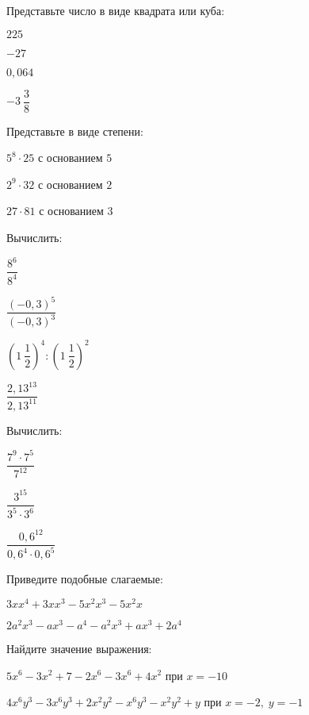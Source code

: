 \begin{listofex}
	\item Представьте число в виде квадрата или куба:
	\begin{enumcols}[itemcolumns=4]
		\item \( 225 \)
		\item \( -27 \)
		\item \(0,064 \)
		\item \( -3\:\dfrac{3}{8} \)
	\end{enumcols}
	\item Представьте в виде степени:
	\begin{enumcols}[itemcolumns=3]
		\item \( 5^8\cdot25 \) с основанием \( 5 \)
		\item \( 2^9\cdot32 \) с основанием \( 2 \)
		\item \( 27\cdot81 \) с основанием \( 3 \)
	\end{enumcols}
	\item Вычислить:
	\begin{enumcols}[itemcolumns=4]
		\item \( \dfrac{8^6}{8^4} \)
		\item \( \dfrac{(-0,3)^5}{(-0,3)^3} \)
		\item \( \left( 1\:\dfrac{1}{2} \right)^4:\left( 1\:\dfrac{1}{2} \right)^2 \)
		\item \( \dfrac{2,13^{13}}{2,13^{11}} \)
	\end{enumcols}
	\item Вычислить:
	\begin{enumcols}[itemcolumns=3]
		\item \( \dfrac{7^9\cdot7^5}{7^{12}} \)
		\item \( \dfrac{3^{15}}{3^5\cdot3^6} \)
		\item \( \dfrac{0,6^{12}}{0,6^4\cdot0,6^5} \)
	\end{enumcols}
	\item Приведите подобные слагаемые:
	\begin{enumcols}[itemcolumns=1]
		\item \( 3xx^4+3xx^3-5x^2x^3-5x^2x \)
		\item \( 2a^2x^3-ax^3-a^4-a^2x^3+ax^3+2a^4 \)
	\end{enumcols}
	\item Найдите значение выражения:
	\begin{enumcols}[itemcolumns=1]
		\item \( 5x^6-3x^2+7-2x^6-3x^6+4x^2 \) при \( x=-10 \)
		\item \( 4x^6y^3-3x^6y^3+2x^2y^2-x^6y^3-x^2y^2+y\) при \( x=-2,\;y=-1 \)

\end{enumcols}
\end{listofex}
